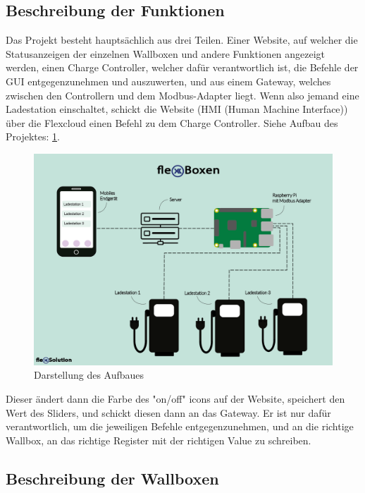 \subsection{Beschreibung der Funktionen} 
Das Projekt besteht hauptsächlich aus drei Teilen. Einer Website, auf welcher die Statusanzeigen der einzelnen Wallboxen und andere Funktionen angezeigt werden, einen Charge Controller, welcher dafür verantwortlich ist, die Befehle der GUI entgegenzunehmen und auszuwerten, und aus einem Gateway, welches zwischen den Controllern und dem Modbus-Adapter liegt. Wenn also jemand eine Ladestation einschaltet, schickt die Website (HMI (Human Machine Interface)) über die Flexcloud einen Befehl zu dem Charge Controller. 
Siehe Aufbau des Projektes: \ref{fig:impl:Infografik_FlexBoxen}.

  \begin{figure}[h t]
    \centering
    \includegraphics[scale=0.5]{pics/Infografik_FlexBoxen.png}
    \caption{Darstellung des Aufbaues}
    \label{fig:impl:Infografik_FlexBoxen}
\end{figure}

Dieser ändert dann die Farbe des "on/off" icons auf der Website, speichert den Wert des Sliders, und schickt diesen dann an das Gateway. Er ist nur dafür verantwortlich, um die jeweiligen Befehle entgegenzunehmen, und an die richtige Wallbox, an das richtige Register mit der richtigen Value zu schreiben. 





\subsection{Beschreibung der Wallboxen} 

